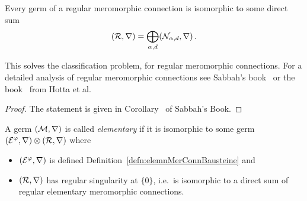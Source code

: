 \begin{prop}
  Every germ of a regular meromorphic connection is isomorphic to some direct
  sum
  \[
    (\mathcal{R},\nabla)=\bigoplus_{\alpha,d}(\mathcal{N}_{\alpha,d},\nabla)\,.
  \]
  \begin{s-rem}
    This solves the classification problem, for regular meromorphic
    connections.
    For a detailed analysis of regular meromorphic connections see Sabbah's
    book~\cite[Sec.II.2]{sabbah2007isomonodromic} or the
    book~\cite[Sec.5.2]{hotta2008} from Hotta et al.
  \end{s-rem}
  \begin{comment}
    \begin{enumerate}
      \item Every germ of a meromorphic connection of rank one is isomorphic to
        some germ
        \[
          (\cE^\phi,\nabla)\otimes(\cN_{\alpha,0},\nabla) \,.
        \]
      \item Two such rank one germs corresponding to $(\phi_1,\alpha_1)$ and
        $(\phi_2,\alpha_2)$ are isomorphic if and only if
        \begin{itemize}
          \item $\phi_1-\phi_2$ has no pole and
          \item $\alpha_1-\alpha_2\in\Z$.
        \end{itemize}
    \end{enumerate}
  \end{comment}
\end{prop}
\begin{proof}
  The statement is given in
  Corollary~\cite[Cor.II.2.9]{sabbah2007isomonodromic} of Sabbah's Book.
\end{proof}
\begin{defn}
  A germ $(\mathcal{M},\nabla)$ is called \emph{elementary} if it is isomorphic to
  some germ $(\mathcal{E}^\varphi,\nabla)\otimes(\mathcal{R},\nabla)$ where
  \begin{itemize}
    \item $(\mathcal{E}^\varphi,\nabla)$ is defined 
      Definition~\ref{defn:elemnMerConnBausteine} and
    \item $(\mathcal{R},\nabla)$ has regular singularity at $\{0\}$, i.e.\ is
      isomorphic to a direct sum of regular elementary meromorphic connections.
  \end{itemize}
\end{defn}
